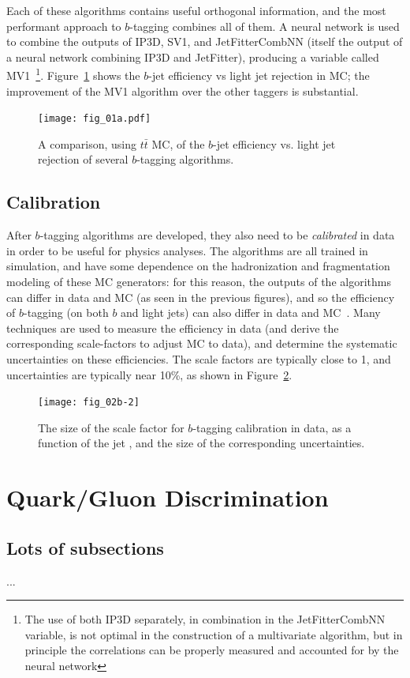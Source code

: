 Each of these algorithms contains useful orthogonal information, and the most performant approach to $b$-tagging combines all of them. A neural network is used to combine the outputs of IP3D, SV1, and JetFitterCombNN (itself the output of a neural network combining IP3D and JetFitter), producing a variable called MV1~\cite{ATLAS-B-Eff}\footnote{The use of both IP3D separately, in combination in the JetFitterCombNN variable, is not optimal in the construction of a multivariate algorithm, but in principle the correlations can be properly measured and accounted for by the neural network}. Figure~\ref{fig:jet-reconstruction:b-tagging:mv1} shows the $b$-jet efficiency vs light jet rejection in MC; the improvement of the MV1 algorithm over the other taggers is substantial.


\begin{figure}
\centering
\texttt{[image: fig\_01a.pdf]}
\label{fig:jet-reconstruction:b-tagging:mv1}
\caption{A comparison, using $t\bar{t}$ MC, of the $b$-jet efficiency vs. light jet rejection of several $b$-tagging algorithms.}
\end{figure}


\subsection{Calibration}

After $b$-tagging algorithms are developed, they also need to be \textit{calibrated} in data in order to be useful for physics analyses. The algorithms are all trained in simulation, and have some dependence on the hadronization and fragmentation modeling of these MC generators: for this reason, the outputs of the algorithms can differ in data and MC (as seen in the previous figures), and so the efficiency of $b$-tagging (on both $b$ and light jets) can also differ in data and MC~\cite{ATLAS-B-Eff,ATLAS-B-Eff-Mistag,ATLAS-B-Eff-LL,ATLAS-B-CL}. Many techniques are used to measure the efficiency in data (and derive the corresponding scale-factors to adjust MC to data), and determine the systematic uncertainties on these efficiencies. The scale factors are typically close to 1, and uncertainties are typically near 10\%, as shown in Figure~\ref{fig:jet-reconstruction:b-tagging:calib}.


\begin{figure}
\centering
\texttt{[image: fig\_02b-2]}
\label{fig:jet-reconstruction:b-tagging:calib}
\caption{The size of the scale factor for $b$-tagging calibration in data, as a function of the jet \pt, and the size of the corresponding uncertainties.}
\end{figure}


\section{Quark/Gluon Discrimination}
	\subsection{Lots of subsections}
		...